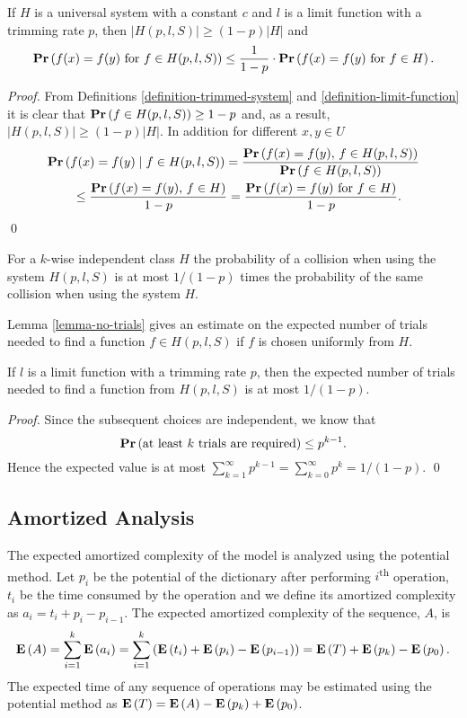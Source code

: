 \begin{lemma}
\label{lemma-trimmed-system}
If $H$ is a universal system with a constant $c$ and $l$ is a limit function with a trimming rate $p$, then $|H(p, l, S)| \geq (1 - p)|H|$ and  \[ \mathbf{Pr}\left(f(x) = f(y) \mbox{ for } f \in H(p, l, S)\right) \leq \frac{1}{1 - p} \cdot \mathbf{Pr}\left(f(x) = f(y) \mbox{ for } f \in H\right). \]
\end{lemma}
\begin{proof}
From Definitions \ref{definition-trimmed-system} and \ref{definition-limit-function} it is clear that $\mathbf{Pr}\left(f \in H(p, l, S)\right) \geq 1 - p$ and, as a result, $|H(p, l, S)| \geq (1 - p)|H|$. In addition for different $x, y \in U$ 
\[
\begin{split}
& \mathbf{Pr}\left(f(x) = f(y) \mid f \in H(p, l, S)\right) 
	= \frac{\mathbf{Pr}\left(f(x) = f(y),\, f \in H(p, l, S)\right)}{\mathbf{Pr}\left(f \in H(p, l, S)\right)} \\
	& \qquad \leq \frac{\mathbf{Pr}\left(f(x) = f(y),\, f \in H\right)}{1 - p} = \frac{\mathbf{Pr}\left(f(x) = f(y) \mbox{ for } f \in H\right)}{1 - p}. \\
\end{split}
\]
\qed
\end{proof}

For a $k$-wise independent class $H$ the probability of a collision when using the system $H(p, l, S)$ is at most $1 / (1 - p)$ times the probability of the same collision when using the system $H$.

Lemma \ref{lemma-no-trials} gives an estimate on the expected number of trials needed to find a function $f \in H(p, l, S)$ if $f$ is chosen uniformly from $H$.

\begin{lemma}
\label{lemma-no-trials}
If $l$ is a limit function with a trimming rate $p$, then the expected number of trials needed to find a function from $H(p, l, S)$ is at most ${1}/{(1 - p)}$.
\end{lemma}
\begin{proof}
Since the subsequent choices are independent, we know that \[\mathbf{Pr}\left(\mbox{at least }k\mbox{ trials are required}\right) \leq p^{k - 1}.\]
Hence the expected value is at most $\sum_{k = 1}^{\infty} p^{k - 1} = \sum_{k = 0}^{\infty} p^k = {1}/{(1 - p)}.$
\qed
\end{proof}

\subsection{Amortized Analysis}
The expected amortized complexity of the model is analyzed using the potential method. Let $p_i$ be the potential of the dictionary after performing $i$\textsuperscript{th} operation, $t_i$ be the time consumed by the operation and we define its amortized complexity as $a_i = t_i + p_i - p_{i - 1}$. The expected amortized complexity of the sequence, $A$, is
\[
\mathbf{E}\left(A\right) = \sum_{i=1}^{k} \mathbf{E}\left(a_i\right) = \sum_{i = 1}^{k} \left(\mathbf{E}\left(t_i\right) + \mathbf{E}\left(p_i\right) - \mathbf{E}\left(p_{i - 1}\right)\right) = \mathbf{E}\left(T\right) + \mathbf{E}\left(p_k\right) - \mathbf{E}\left(p_0\right).
\]
The expected time of any sequence of operations may be estimated using the potential method as $\mathbf{E}\left(T\right) = \mathbf{E}\left(A\right) - \mathbf{E}\left(p_k\right) + \mathbf{E}\left(p_0\right)$.

